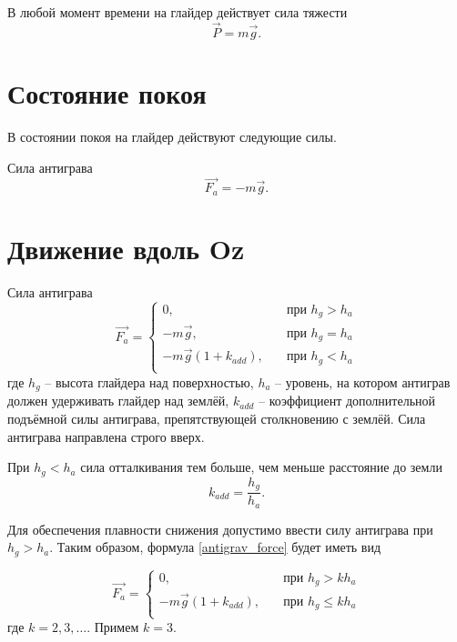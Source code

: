\documentclass[a4paper,12pt]{report}
\begin{document}
В любой момент времени на глайдер действует сила тяжести
\begin{equation}
\vec{P} = m\vec{g}.
\end{equation}

\section{Состояние покоя}

В состоянии покоя на глайдер действуют следующие силы.

Сила антиграва
\begin{equation}
\vec{F_a} =
-m\vec{g}.
\end{equation}

\section{Движение вдоль Oz}

Сила антиграва
\begin{equation}
\label{antigrav_force}
\vec{F_a} =
\begin{cases}
0, & \quad \text{при } h_{g} > h_a \\
-m\vec{g}, & \quad \text{при } h_{g} = h_a \\
-m\vec{g}(1+ k_{add}), & \quad \text{при } h_{g} < h_a \\
\end{cases}
\end{equation}
где $h_{g}$ -- высота глайдера над поверхностью, $h_a$ -- уровень, на котором антиграв должен удерживать глайдер над землёй, $k_{add}$ -- коэффициент дополнительной подъёмной силы антиграва, препятствующей столкновению с землёй.
Сила антиграва направлена строго вверх.

При $h_g < h_a$ сила отталкивания тем больше, чем меньше расстояние до земли
\begin{equation}
k_{add} =\frac{h_{g}}{h_{a}}.
\end{equation}

Для обеспечения плавности снижения допустимо ввести силу антиграва при $h_{g} > h_a$. Таким образом, формула \eqref{antigrav_force} будет иметь вид

\begin{equation}
\vec{F_a} =
\begin{cases}
0, & \quad \text{при } h_{g} > k h_a \\
-m\vec{g}(1+ k_{add}), & \quad \text{при } h_{g} \le k h_a \\
\end{cases}
\end{equation}
где $k=2,3,\dots$. Примем $k=3$.
\end{document}
